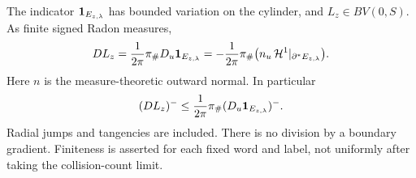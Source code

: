 \begin{theorem}
\label{thm:v70-physical-current}
The indicator $\mathbf1_{E_{z,\lambda}}$ has bounded variation on the
cylinder, and $L_z\in BV(0,S)$. As finite signed Radon measures,
\begin{equation}\label{eq:v70-signed-current}
 DL_z=\frac1{2\pi}\pi_\#D_u\one_{E_{z,\lambda}}
     =-\frac1{2\pi}\pi_\#
       \bigl(n_u\,\mathcal H^1|_{\partial^*E_{z,\lambda}}\bigr).
\end{equation}
Here $n$ is the measure-theoretic outward normal. In particular
\begin{equation}\label{eq:v70-negative-current}
 (DL_z)^-\le\frac1{2\pi}\pi_\#(D_u\one_{E_{z,\lambda}})^-.
\end{equation}
Radial jumps and tangencies are included. There is no division by a
boundary gradient. Finiteness is asserted for each fixed word and
label, not uniformly after taking the collision-count limit.
\end{theorem}
